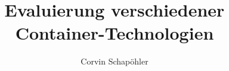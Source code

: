 

\title{Evaluierung verschiedener Container-Technologien}
\author{Corvin Schapöhler}


	
	
	
	
	\frontmatter
	\pagestyle{front}
	
%	
	

	\setcounter{tocdepth}{1}
	\tableofcontents

	\mainmatter
	\pagestyle{main}
	
	
	
	\backmatter
	\pagestyle{back}
	
	
